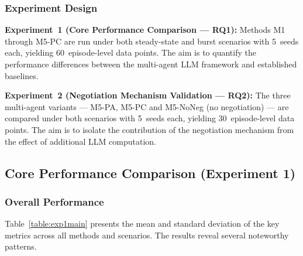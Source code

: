 \subsubsection{Experiment Design}

\textbf{Experiment~1 (Core Performance Comparison --- RQ1):} Methods M1 through M5-PC are run under both steady-state and burst scenarios with 5~seeds each, yielding 60~episode-level data points. The aim is to quantify the performance differences between the multi-agent LLM framework and established baselines.

\textbf{Experiment~2 (Negotiation Mechanism Validation --- RQ2):} The three multi-agent variants --- M5-PA, M5-PC and M5-NoNeg (no negotiation) --- are compared under both scenarios with 5~seeds each, yielding 30~episode-level data points. The aim is to isolate the contribution of the negotiation mechanism from the effect of additional LLM computation.

\subsection{Core Performance Comparison (Experiment 1)}

\subsubsection{Overall Performance}

Table~\ref{table:exp1main} presents the mean and standard deviation of the key metrics across all methods and scenarios. The results reveal several noteworthy patterns.

